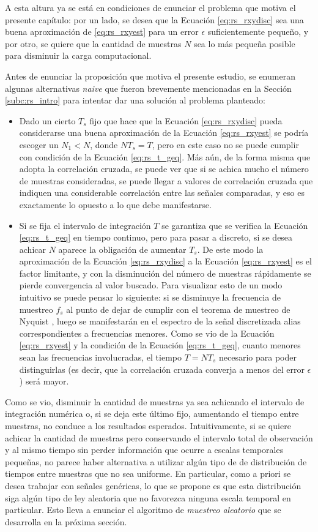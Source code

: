 A esta altura ya se está en condiciones de enunciar el problema que motiva el presente capítulo: por un lado, se desea que la Ecuación \ref{eq:rs_rxydisc} sea una buena aproximación de \ref{eq:rs_rxyest} para un error $\epsilon$ suficientemente pequeño, y por otro, se quiere que la cantidad de muestras $N$ sea lo más pequeña posible para disminuir la carga computacional.

Antes de enunciar la proposición que motiva el presente estudio, se enumeran algunas alternativas \emph{naive} que fueron brevemente mencionadas en la Sección \ref{subc:rs_intro} para intentar dar una solución al problema planteado:
\begin{itemize}
    \item Dado un cierto $T_s$ fijo que hace que la Ecuación \ref{eq:rs_rxydisc} pueda considerarse una buena aproximación de la Ecuación \ref{eq:rs_rxyest} se podría escoger un $N_1<N$, donde $NT_s=T$, pero en este caso no se puede cumplir con condición de la Ecuación \ref{eq:rs_t_geq}. Más aún, de la forma misma que adopta la correlación cruzada, se puede ver que si se achica mucho el número de muestras consideradas, se puede llegar a valores de correlación cruzada que indiquen una considerable correlación entre las señales comparadas, y eso es exactamente lo opuesto a lo que debe manifestarse.
    \item Si se fija el intervalo de integración $T$ se garantiza que se verifica la Ecuación \ref{eq:rs_t_geq} en tiempo continuo, pero para pasar a discreto, si se desea achicar $N$ aparece la obligación de aumentar $T_s$. De este modo la aproximación de la Ecuación \ref{eq:rs_rxydisc} a la Ecuación \ref{eq:rs_rxyest} es el factor limitante, y con la disminución del número de muestras rápidamente se pierde convergencia al valor buscado. Para visualizar esto de un modo intuitivo se puede pensar lo siguiente: si se disminuye la frecuencia de muestreo $f_s$ al punto de dejar de cumplir con el teorema de muestreo de Nyquist \cite{bib:nyquist}, luego se manifestarán en el espectro de la señal discretizada alias correspondientes a frecuencias menores. Como se vio de la Ecuación \ref{eq:rs_rxyest} y la condición de la Ecuación \ref{eq:rs_t_geq}, cuanto menores sean las frecuencias involucradas, el tiempo $T=NT_s$ necesario para poder distinguirlas (es decir, que la correlación cruzada converja a menos del error $\epsilon$) será mayor.
\end{itemize}

Como se vio, disminuir la cantidad de muestras ya sea achicando el intervalo de integración numérica o, si se deja este último fijo, aumentando el tiempo entre muestras, no conduce a los resultados esperados. Intuitivamente, si se quiere achicar la cantidad de muestras pero conservando el intervalo total de observación y al mismo tiempo sin perder información que ocurre a escalas temporales pequeñas, no parece haber alternativa a utilizar algún tipo de de distribución de tiempos entre muestras que no sea uniforme. En particular, como a priori se desea trabajar con señales genéricas, lo que se propone es que esta distribución siga algún tipo de ley aleatoria que no favorezca ninguna escala temporal en particular. Esto lleva a enunciar el algoritmo de \emph{muestreo aleatorio} que se desarrolla en la próxima sección.

